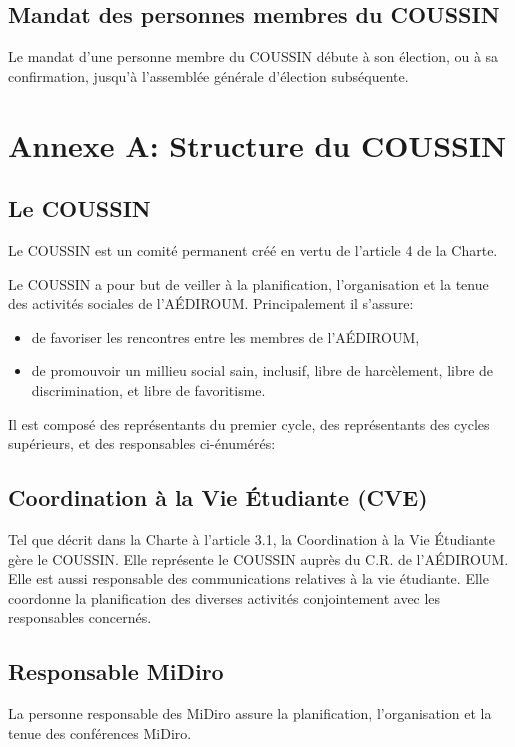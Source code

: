 \documentclass{aediroum}
\begin{document}
\subsection{Mandat des personnes membres du COUSSIN}
Le mandat d'une personne membre du COUSSIN débute à son élection, ou à sa confirmation, jusqu'à l'assemblée générale d'élection subséquente.

\section{Annexe A: Structure du COUSSIN}

\setcounter{subsection}{-1}
\subsection{Le COUSSIN}
Le COUSSIN est un comité permanent créé en vertu de l'article 4 de la Charte.

Le COUSSIN a pour but de veiller à la planification, l'organisation et la tenue des activités sociales de l'AÉDIROUM. Principalement il s'assure:
\begin{itemize}
	\item de favoriser les rencontres entre les membres de l'AÉDIROUM,
	\item de promouvoir un millieu social sain, inclusif, libre de harcèlement, libre de discrimination, et libre de favoritisme.
\end{itemize}

Il est composé des représentants du premier cycle, des représentants des cycles supérieurs, et des responsables ci-énumérés:

\subsection{Coordination à la Vie Étudiante (CVE)}
Tel que décrit dans la Charte à l'article 3.1, la Coordination à la Vie Étudiante gère le COUSSIN. Elle représente le COUSSIN auprès du C.R. de l'AÉDIROUM. Elle est aussi responsable des communications relatives à la vie étudiante. Elle coordonne la planification des diverses activités conjointement avec les responsables concernés.

\subsection{Responsable MiDiro}
La personne responsable des MiDiro assure la planification, l'organisation et la tenue des conférences MiDiro.
\end{document}
